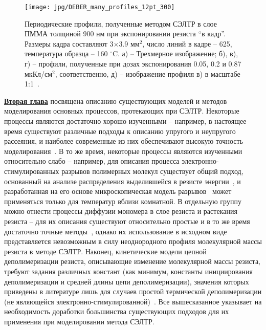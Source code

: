 \begin{figure}
	\centering
	\texttt{[image: jpg/DEBER\_many\_profiles\_12pt\_300]}
	\caption{Периодические профили, полученные методом СЭЛТР в слое ПММА толщиной 900 нм при экспонировании резиста ``в кадр''. Размеры кадра составляют 3$\times$3.9 мм$^2$, число линий в кадре -- 625, температура образца -- 160 $^\circ$C. а) --  Трехмерное изображение; б), в), г) -- профили, полученные при дозах экспонирования 0.05, 0.2 и 0.87 мкКл/см$^2$, соответственно, д) -- изображение профиля в) в масштабе 1:1~\cite{Bruk_2016_mee}.}
	\label{fig:DEBER_many_profiles}
\end{figure}

\underline{\textbf{Вторая глава}} посвящена описанию существующих моделей и методов моделирования основных процессов, протекающих при СЭЛТР. Некоторые процессы являются достаточно хорошо изученными -- например, в настоящее время существуют различные подходы к описанию упругого и неупругого рассеяния, и наиболее современные из них обеспечивают высокую точность моделирования~\cite{Czyzewski_mott_cs, Ciappa_2010, Valentin2012_Si}. В то же время, некоторые процессы являются изученными относительно слабо -- например, для описания процесса электронно-стимулированных разрывов полимерных молекул существует общий подход, основанный на анализе распределения выделившейся в резисте энергии~\cite{Greeneich1979_Mf_Mn}, и разработанная на его основе микроскопическая модель разрывов~\cite{Stepanova_2006} может применяться только для температур вблизи комнатной. В отдельную группу можно отнести процессы диффузии мономера в слое резиста и растекания резиста -- для их описания существуют относительно простые и в то же время достаточно точные методы~\cite{Vrentas_free_volume, Fragala_3_diffusion, Karlsson2001_diffusion, Leveder_2010, Kirchner_reflow}, однако их использование в исходном виде представляется невозможным в силу неоднородного профиля молекулярной массы резиста в методе СЭЛТР. Наконец, кинетические модели цепной деполимеризации резиста, описывающие изменение молекулярной массы резиста, требуют задания различных констант (как минимум, константы инициирования деполимеризации и средней длины цепи деполимеризации), значения которых приведены в литературе лишь для случаев простой термической деполимеризации (не являющейся электронно-стимулированной)~\cite{Boyd_3, Mita_PMMA_zip_lengths_T}. Все вышесказанное указывает на необходимость доработки большинства существующих подходов для их применения при моделировании метода СЭЛТР.


